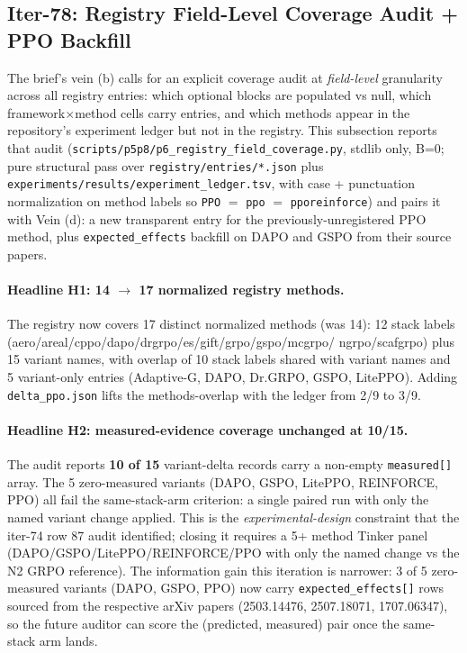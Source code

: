 \subsection{Iter-78: Registry Field-Level Coverage Audit + PPO Backfill}
\label{sec:p6-iter78-field-coverage}

The brief's vein (b) calls for an explicit coverage audit at
\emph{field-level} granularity across all registry entries: which optional
blocks are populated vs null, which framework$\times$method cells carry
entries, and which methods appear in the repository's experiment ledger
but not in the registry. This subsection reports that audit
(\texttt{scripts/p5p8/p6\_registry\_field\_coverage.py}, stdlib only,
B=0; pure structural pass over \texttt{registry/entries/*.json} plus
\texttt{experiments/results/experiment\_ledger.tsv}, with case +
punctuation normalization on method labels so \texttt{PPO} $=$
\texttt{ppo} $=$ \texttt{pporeinforce}) and pairs it with Vein (d): a
new transparent entry for the previously-unregistered PPO method, plus
\texttt{expected\_effects} backfill on DAPO and GSPO from their
source papers.

\paragraph{Headline H1: 14 $\rightarrow$ 17 normalized registry methods.}
The registry now covers 17 distinct normalized methods (was 14):
12 stack labels (aero/areal/cppo/dapo/drgrpo/es/gift/grpo/gspo/mcgrpo/
ngrpo/scafgrpo) plus 15 variant names, with overlap of 10 stack labels
shared with variant names and 5 variant-only entries (Adaptive-G,
DAPO, Dr.GRPO, GSPO, LitePPO). Adding \texttt{delta\_ppo.json} lifts
the methods-overlap with the ledger from 2/9 to 3/9.

\paragraph{Headline H2: measured-evidence coverage unchanged at 10/15.}
The audit reports \textbf{10 of 15} variant-delta records carry a
non-empty \texttt{measured[]} array. The 5 zero-measured variants
(DAPO, GSPO, LitePPO, REINFORCE, PPO) all fail the same-stack-arm
criterion: a single paired run with only the named variant change
applied. This is the \emph{experimental-design} constraint that the
iter-74 row 87 audit identified; closing it requires a 5+ method
Tinker panel (DAPO/GSPO/LitePPO/REINFORCE/PPO with only the named
change vs the N2 GRPO reference). The information gain this iteration is
narrower: 3 of 5 zero-measured variants (DAPO, GSPO, PPO) now carry
\texttt{expected\_effects[]} rows sourced from the respective arXiv
papers (2503.14476, 2507.18071, 1707.06347), so the future auditor
can score the (predicted, measured) pair once the same-stack arm
lands.


